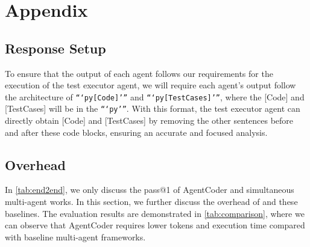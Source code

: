 \appendix
\section{Appendix}\label{sec:appendix}

\subsection{Response Setup}
To ensure that the output of each agent follows our requirements for the execution of the test executor agent, we will require each agent's output follow the architecture of \texttt{```py[Code]'''} and \texttt{```py[TestCases]'''}, where the [Code] and [TestCases] will be in the \texttt{```py'''}. With this format, the test executor agent can directly obtain [Code] and [TestCases] by removing the other sentences before and after these code blocks, ensuring an accurate and focused analysis.

\subsection{Overhead}
In \cref{tab:end2end}, we only discuss the pass@1 of AgentCoder and simultaneous multi-agent works. In this section, we further discuss the overhead of \xxx and these baselines. The evaluation results are demonstrated in \cref{tab:comparison}, where we can observe that AgentCoder requires lower tokens and execution time compared with baseline multi-agent frameworks.

\begin{table}[h!]
    \centering
    \caption{pass@1 of AgentCoder and baselines in GPT4. We utilize the tiktoken package to calculate agent response token usage. Tokens and Overhead are calculated for the HumanEval / MBPP.}
    \label{tab:comparison}
\end{table}

